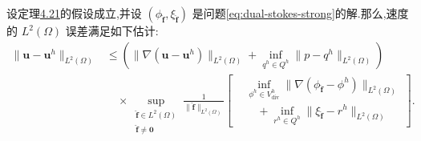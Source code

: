 \begin{theorem}\label{thm:stokes-error-velocity-l2}
设定理\hyperref[thm:stokes-error-velocity-h1]{4.21}的假设成立,并设 $(\phi_{\widehat{\bm{f}}},\xi_{\widehat{\bm{f}}})$ 是问题\cref{eq:dual-stokes-strong}的解.那么,速度的 $L^2(\Omega)$ 误差满足如下估计:
\begingroup\small
\begin{equation}\label{eq:stokes-error-velocity-l2}
\begin{aligned}
  \|\bm{u}-\bm{u}^h\|_{L^2(\Omega)}
  &\leq
  \left(
    \|\nabla(\bm{u}-\bm{u}^h)\|_{L^2(\Omega)}
    +\inf_{q^h\in Q^h}\|p-q^h\|_{L^2(\Omega)}
  \right)\\
  &\quad\times
  \sup_{\substack{\widehat{\bm{f}}\in L^2(\Omega)\\
                   \widehat{\bm{f}}\neq\bm{0}}}
  \frac{1}{\|\widehat{\bm{f}}\|_{L^2(\Omega)}}
  \left[
    \begin{aligned}
      &\inf_{\phi^h\in V_{\mathrm{div}}^h}
        \|\nabla(\phi_{\widehat{\bm{f}}}-\phi^h)\|_{L^2(\Omega)}\\
      &\quad+\inf_{r^h\in Q^h}
        \|\xi_{\widehat{\bm{f}}}-r^h\|_{L^2(\Omega)}
    \end{aligned}
  \right].
\end{aligned}
\end{equation}
\endgroup
\end{theorem}
